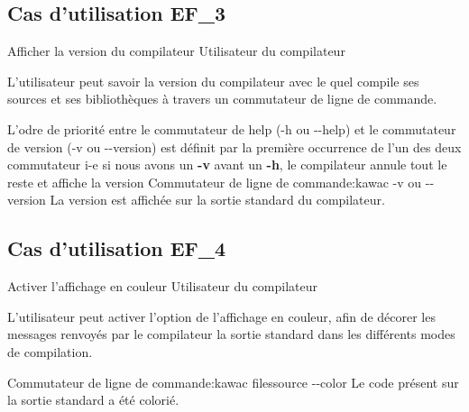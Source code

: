 \subsection{Cas d'utilisation EF\_3}
\fiche
{Afficher la version du compilateur}                      %
{Utilisateur du compilateur}                               %
{                                                %
   
L'utilisateur peut savoir la version du compilateur avec le quel compile ses sources et ses bibliothèques  à travers un commutateur de ligne de commande.   
}
{
   L'odre de priorité entre le commutateur de help (-h ou -\hspace{0.1mm}-help) et le commutateur de version (-v ou -\hspace{0.1mm}-version) est définit par la première occurrence de l'un des deux commutateur i-e si nous avons un \textbf {-v} avant un \textbf {-h}, le compilateur annule tout le reste et affiche la version
}                                                %
{Commutateur de ligne de commande:kawac -v ou -\hspace{0.1mm}-version}                             %
{La version est affichée sur la sortie standard du compilateur.}                       %
{                                                %
 
}{} %
{} %


\subsection{Cas d'utilisation EF\_4}
\fiche
{Activer l'affichage en couleur}          %
{Utilisateur du compilateur}                               %
{                                                %
   
  L'utilisateur peut activer l'option de l'affichage en couleur, afin de décorer les messages renvoyés par le compilateur la sortie standard dans les différents modes de compilation.   
}
{
  
}                                                %
{Commutateur de ligne de commande:kawac filessource -\hspace{0.1mm}-color}  %
{Le code présent sur la sortie standard a été colorié.}                       %
{                                                %
 
}{} %
{} %
